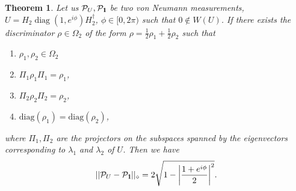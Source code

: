 \documentclass[11pt,a4paper,reqno, oneside]{amsart}
\DeclareMathOperator{\diag}{diag}
\newcommand{\1}{{\rm 1\hspace{-0.9mm}l}}
\newcommand{\Id}{{\rm 1\hspace{-0.9mm}l}}
\newcommand{\XX}{\mathcal{X}}
\newtheorem{theorem}{Theorem}
\begin{document}
\begin{theorem}\label{rozrpomiarow}
Let us $\mathcal{P}_U, \mathcal{P}_\1$ be two von Neumann measurements,  $U = H_2 \diag(1, e^{i \phi}) H_2^\dagger$, $\phi \in [0, 2\pi)$ such that $0 \not\in W(U)$.  If there exists the discriminator $\rho \in \Omega_2$ of the form $\rho = \frac{1}{2}\rho_1 + \frac{1}{2} \rho_2$ such that
	\begin{enumerate}
		\item $\rho_1,\rho_2 \in \Omega_2$
		\item $\Pi_1 \rho_1 \Pi_1 = \rho_1$,
		\item $\Pi_2 \rho_2 \Pi_2 = \rho_2$,
		\item  $\mathrm{diag}(\rho_1) = \mathrm{diag}(\rho_2)$,
	\end{enumerate}
	where $\Pi_1,\Pi_2 $ are the projectors on the subspaces
	spanned by the eigenvectors corresponding to $\lambda_1$ and $\lambda_2$ of $U$. Then  we have 
	\begin{equation}
	||\mathcal{P}_U - \mathcal{P}_\Id||_\diamond = 2\sqrt{1- \left|\frac{1+e^{i \phi}}{2}\right|^2}.
	\end{equation}
\end{theorem}
\end{document}
